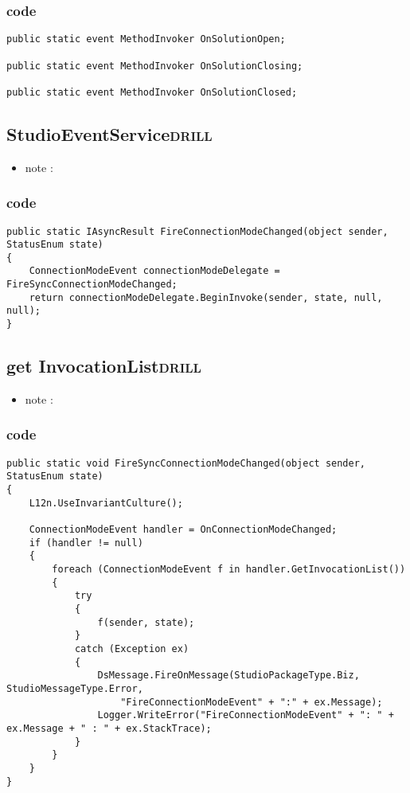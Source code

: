 \documentclass[11pt]{article}
\begin{document}
\subsubsection{code}
\label{sec:org27f57b0}
\begin{verbatim}
public static event MethodInvoker OnSolutionOpen;

public static event MethodInvoker OnSolutionClosing;

public static event MethodInvoker OnSolutionClosed;

\end{verbatim}

\subsection{StudioEventService\hfill{}\textsc{drill}}
\label{sec:org0fd6efc}
\begin{itemize}
\item note :
\end{itemize}
\subsubsection{code}
\label{sec:orgb16ec1f}
\begin{verbatim}
public static IAsyncResult FireConnectionModeChanged(object sender, StatusEnum state)
{
    ConnectionModeEvent connectionModeDelegate = FireSyncConnectionModeChanged;
    return connectionModeDelegate.BeginInvoke(sender, state, null, null);
}

\end{verbatim}

\subsection{get InvocationList\hfill{}\textsc{drill}}
\label{sec:orgfed0143}
\begin{itemize}
\item note :
\end{itemize}
\subsubsection{code}
\label{sec:org22fae31}
\begin{verbatim}
public static void FireSyncConnectionModeChanged(object sender, StatusEnum state)
{
    L12n.UseInvariantCulture();

    ConnectionModeEvent handler = OnConnectionModeChanged;
    if (handler != null)
    {
        foreach (ConnectionModeEvent f in handler.GetInvocationList())
        {
            try
            {
                f(sender, state);
            }
            catch (Exception ex)
            {
                DsMessage.FireOnMessage(StudioPackageType.Biz, StudioMessageType.Error,
                    "FireConnectionModeEvent" + ":" + ex.Message);
                Logger.WriteError("FireConnectionModeEvent" + ": " + ex.Message + " : " + ex.StackTrace);
            }
        }
    }
}

\end{verbatim}
\end{document}
